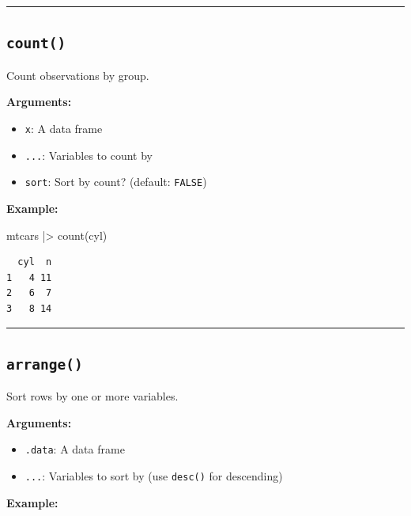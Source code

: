 \documentclass[
  letterpaper,
  DIV=11,
  numbers=noendperiod]{scrreprt}
\newenvironment{Shaded}{\begin{snugshade}}{\end{snugshade}}
\newcommand{\FunctionTok}[1]{\textcolor[rgb]{0.28,0.35,0.67}{#1}}
\newcommand{\NormalTok}[1]{\textcolor[rgb]{0.00,0.23,0.31}{#1}}
\newcommand{\SpecialCharTok}[1]{\textcolor[rgb]{0.37,0.37,0.37}{#1}}
\providecommand{\tightlist}{%
  \setlength{\itemsep}{0pt}\setlength{\parskip}{0pt}}
\begin{document}
\begin{center}\rule{0.5\linewidth}{0.5pt}\end{center}

\subsection{\texorpdfstring{\texttt{count()}}{count()}}\label{count}

Count observations by group.

\textbf{Arguments:}

\begin{itemize}
\tightlist
\item
  \texttt{x}: A data frame
\item
  \texttt{...}: Variables to count by
\item
  \texttt{sort}: Sort by count? (default: \texttt{FALSE})
\end{itemize}

\textbf{Example:}

\begin{Shaded}
\begin{Highlighting}[]
\NormalTok{mtcars }\SpecialCharTok{|\textgreater{}}
  \FunctionTok{count}\NormalTok{(cyl)}
\end{Highlighting}
\end{Shaded}

\begin{verbatim}
  cyl  n
1   4 11
2   6  7
3   8 14
\end{verbatim}

\begin{center}\rule{0.5\linewidth}{0.5pt}\end{center}

\subsection{\texorpdfstring{\texttt{arrange()}}{arrange()}}\label{arrange}

Sort rows by one or more variables.

\textbf{Arguments:}

\begin{itemize}
\tightlist
\item
  \texttt{.data}: A data frame
\item
  \texttt{...}: Variables to sort by (use \texttt{desc()} for
  descending)
\end{itemize}

\textbf{Example:}
\end{document}
